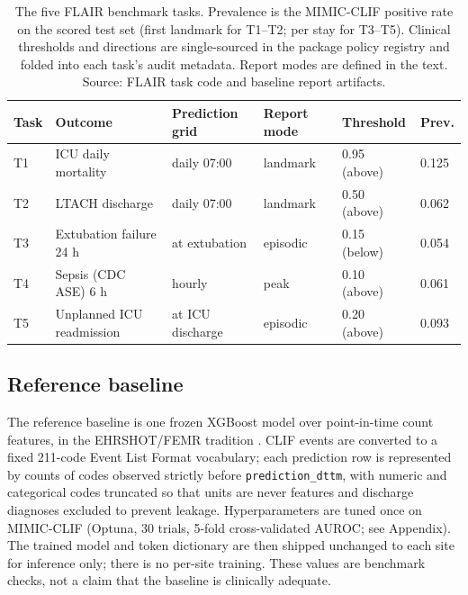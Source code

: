 \documentclass[12pt]{article}
\begin{document}
\begin{table}[t]
\centering
\footnotesize
\setlength{\tabcolsep}{5pt}
\begin{tabular}{llllll}
\toprule
\textbf{Task} & \textbf{Outcome} & \textbf{Prediction grid} & \textbf{Report mode} & \textbf{Threshold} & \textbf{Prev.} \\
\midrule
T1 & ICU daily mortality       & daily 07:00      & landmark & 0.95 (above) & 0.125 \\
T2 & LTACH discharge           & daily 07:00      & landmark & 0.50 (above) & 0.062 \\
T3 & Extubation failure 24 h   & at extubation    & episodic & 0.15 (below) & 0.054 \\
T4 & Sepsis (CDC ASE) 6 h      & hourly           & peak     & 0.10 (above) & 0.061 \\
T5 & Unplanned ICU readmission & at ICU discharge & episodic & 0.20 (above) & 0.093 \\
\bottomrule
\end{tabular}
\caption{The five FLAIR benchmark tasks. Prevalence is the MIMIC-CLIF positive rate on the scored test set (first landmark for T1--T2; per stay for T3--T5). Clinical thresholds and directions are single-sourced in the package policy registry and folded into each task's audit metadata. Report modes are defined in the text. Source: FLAIR task code and baseline report artifacts.}
\label{tab:taskspec}
\end{table}

\subsection*{Reference baseline}

The reference baseline is one frozen XGBoost model over point-in-time count features, in the EHRSHOT/FEMR tradition \citep{wornow2023ehrshot,steinberg2021femr}. CLIF events are converted to a fixed 211-code Event List Format vocabulary; each prediction row is represented by counts of codes observed strictly before \texttt{prediction\_dttm}, with numeric and categorical codes truncated so that units are never features and discharge diagnoses excluded to prevent leakage. Hyperparameters are tuned once on MIMIC-CLIF (Optuna, 30 trials, 5-fold cross-validated AUROC; see Appendix). The trained model and token dictionary are then shipped unchanged to each site for inference only; there is no per-site training. These values are benchmark checks, not a claim that the baseline is clinically adequate.
\end{document}
